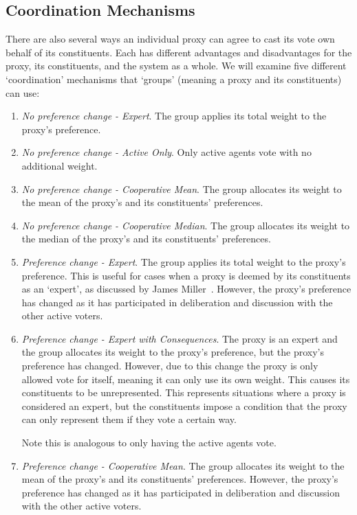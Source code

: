 \subsection{Coordination Mechanisms}
\label{subsec:coordination-mechanisms}
There are also several ways an individual proxy can agree to cast its vote own behalf
of its constituents.
Each has different advantages and disadvantages for the proxy, its constituents, and
the system as a whole.
We will examine five different `coordination' mechanisms that `groups' (meaning a
proxy and its constituents) can use:
\begin{enumerate}
    \item {
        \textit{No preference change - Expert}.
        The group applies its total weight to the proxy's preference.
    }
    \item {
        \textit{No preference change - Active Only}.
        Only active agents vote with no additional weight.
    }
    \item {
        \textit{No preference change - Cooperative Mean}.
        The group allocates its weight to the mean of the proxy's and its
        constituents' preferences.
    }
    \item {
        \textit{No preference change - Cooperative Median}.
        The group allocates its weight to the median of the proxy's and its
        constituents' preferences.
    }
    \item {
        \textit{Preference change - Expert}.
        The group applies its total weight to the proxy's preference.
        This is useful for cases when a proxy is deemed by its constituents as an
        `expert', as discussed by James Miller~\cite{Miller1969}.
        However, the proxy's preference has changed as it has participated in
        deliberation and discussion with the other active voters.
    }
    \item {
        \textit{Preference change - Expert with Consequences}.
        The proxy is an expert and the group allocates its weight to the proxy's
        preference, but the proxy's preference has changed.
        However, due to this change the proxy is only allowed vote for itself,
        meaning it can only use its own weight.
        This causes its constituents to be unrepresented.
        This represents situations where a proxy is considered an expert, but the
        constituents impose a condition that the proxy can only represent them if
        they vote a certain way.

        Note this is analogous to only having the active agents vote.
    }
    \item {
        \textit{Preference change - Cooperative Mean}.
        The group allocates its weight to the mean of the proxy's and its
        constituents' preferences.
        However, the proxy's preference has changed as it has participated in
        deliberation and discussion with the other active voters.
        
}
\end{enumerate}
